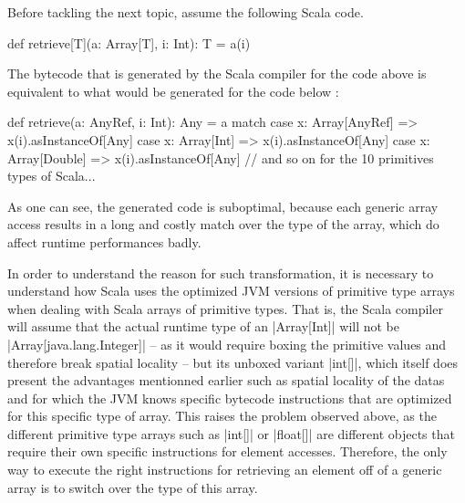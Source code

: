 
Before tackling the next topic, assume the following Scala code.

\begin{lstlisting-nobreak}
  def retrieve[T](a: Array[T], i: Int): T = {
    a(i)
  }
\end{lstlisting-nobreak}

The bytecode that is generated by the Scala compiler for the code above is equivalent to what would be generated for the code below :

\begin{lstlisting-nobreak}
  def retrieve(a: AnyRef, i: Int): Any = {
    a match {
      case x: Array[AnyRef] => x(i).asInstanceOf[Any]
      case x: Array[Int] => x(i).asInstanceOf[Any]
      case x: Array[Double] => x(i).asInstanceOf[Any]
      // and so on for the 10 primitives types of Scala...
    }
  }
\end{lstlisting-nobreak}

As one can see, the generated code is suboptimal, because each generic array access results in a long and costly match over the type of the array, which do affect runtime performances badly.


In order to understand the reason for such transformation, it is necessary to understand how Scala uses the optimized JVM versions of primitive type arrays when dealing with Scala arrays of primitive types. That is, the Scala compiler will assume that the actual runtime type of an |Array[Int]| will not be |Array[java.lang.Integer]| -- as it would require boxing the primitive values and therefore break spatial locality -- but its unboxed variant |int[]|, which itself does present the advantages mentionned earlier such as spatial locality of the datas and for which the JVM knows specific bytecode instructions that are optimized for this specific type of array. This raises the problem observed above, as the different primitive type arrays such as |int[]| or |float[]| are different objects that require their own specific instructions for element accesses. Therefore, the only way to execute the right instructions for retrieving an element off of a generic array is to switch over the type of this array.

